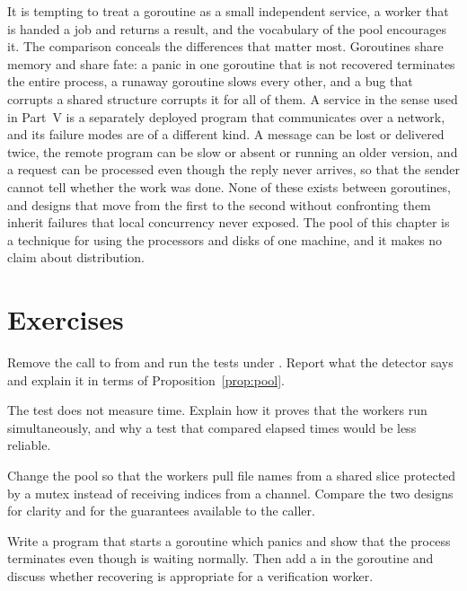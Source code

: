 It is tempting to treat a goroutine as a small independent service, a worker that is handed a job and returns a result, and the vocabulary of the pool encourages it. The comparison conceals the differences that matter most. Goroutines share memory and share fate: a panic in one goroutine that is not recovered terminates the entire process, a runaway goroutine slows every other, and a bug that corrupts a shared structure corrupts it for all of them. A service in the sense used in Part~V is a separately deployed program that communicates over a network, and its failure modes are of a different kind. A message can be lost or delivered twice, the remote program can be slow or absent or running an older version, and a request can be processed even though the reply never arrives, so that the sender cannot tell whether the work was done. None of these exists between goroutines, and designs that move from the first to the second without confronting them inherit failures that local concurrency never exposed. The pool of this chapter is a technique for using the processors and disks of one machine, and it makes no claim about distribution.


\section*{Exercises}

\begin{exercise}
Remove the call to  from  and run the tests under . Report what the detector says and explain it in terms of Proposition~\ref{prop:pool}.
\end{exercise}

\begin{exercise}
The test  does not measure time. Explain how it proves that the workers run simultaneously, and why a test that compared elapsed times would be less reliable.
\end{exercise}

\begin{exercise}
Change the pool so that the workers pull file names from a shared slice protected by a mutex instead of receiving indices from a channel. Compare the two designs for clarity and for the guarantees available to the caller.
\end{exercise}

\begin{exercise}
Write a program that starts a goroutine which panics and show that the process terminates even though  is waiting normally. Then add a  in the goroutine and discuss whether recovering is appropriate for a verification worker.
\end{exercise}
